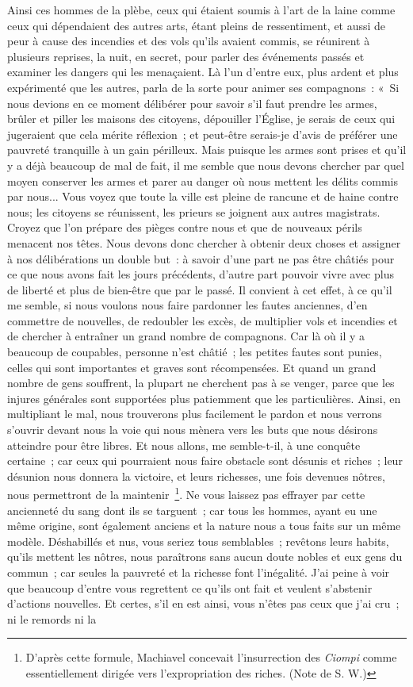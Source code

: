 \documentclass[french,twoside]{book} %
\newenvironment{quoteblock}%
  {\begin{quoting}}
  {\end{quoting}}
\newenvironment{quotebar}{%
    \def\FrameCommand{{\color{rubric!10!}\vrule width 0.5em} \hspace{0.9em}}%
    \def\OuterFrameSep{\itemsep} %
    \MakeFramed {\advance\hsize-\width \FrameRestore}
  }%
  {%
    \endMakeFramed
  }
\renewenvironment{quoteblock}%
  {%
    \savenotes
    \setstretch{0.9}
    \normalfont
    \begin{quotebar}
  }
  {%
    \end{quotebar}
    \spewnotes
  }
\begin{document}
\begin{quoteblock}
 Ainsi ces hommes de la plèbe, ceux qui étaient soumis à l'art de la laine comme ceux qui dépendaient des autres arts, étant pleins de ressentiment, et aussi de peur à cause des incendies et des vols qu'ils avaient commis, se réunirent à plusieurs reprises, la nuit, en secret, pour parler des événements passés et examiner les dangers qui les menaçaient. Là l'un d'entre eux, plus ardent et plus expérimenté que les autres, parla de la sorte pour animer ses compagnons : « Si nous devions en ce moment délibérer pour savoir s'il faut prendre les armes, brûler et piller les maisons des citoyens, dépouiller l'Église, je serais de ceux qui jugeraient que cela mérite réflexion ; et peut-être serais-je d'avis de préférer une pauvreté tranquille à un gain périlleux. Mais puisque les armes sont prises et qu'il y a déjà beaucoup de mal de fait, il me semble que nous devons chercher par quel moyen conserver les armes et parer au danger où nous mettent les délits commis par nous... Vous voyez que toute la ville est pleine de rancune et de haine contre nous; les citoyens se réunissent, les prieurs se joignent aux autres magistrats. Croyez que l'on prépare des pièges contre nous et que de nouveaux périls menacent nos têtes. Nous devons donc chercher à obtenir deux choses et assigner à nos délibérations un double but : à savoir d'une part ne pas être châtiés pour ce que nous avons fait les jours précédents, d'autre part pouvoir vivre avec plus de liberté et plus de bien-être que par le passé. Il convient à cet effet, à ce qu'il me semble, si nous voulons nous faire pardonner les fautes anciennes, d'en commettre de nouvelles, de redoubler les excès, de multiplier vols et incendies et de chercher à entraîner un grand nombre de compagnons. Car là où il y a beaucoup de coupables, personne n'est châtié ; les petites fautes sont punies, celles qui sont impor­tantes et graves sont récompensées. Et quand un grand nombre de gens souf­frent, la plupart ne cherchent pas à se venger, parce que les injures générales sont supportées plus patiemment que les particulières. Ainsi, en multipliant le mal, nous trouverons plus facilement le pardon et nous verrons s'ouvrir devant nous la voie qui nous mènera vers les buts que nous désirons atteindre pour être libres. Et nous allons, me semble-t-il, à une conquête certaine ; car ceux qui pourraient nous faire obstacle sont désunis et riches ; leur désunion nous donnera la victoire, et leurs richesses, une fois devenues nôtres, nous permet­tront de la maintenir \footnote{ D'après cette formule, Machiavel concevait l'insurrection des {\itshape Ciompi} comme essentiellement dirigée vers l'expropriation des riches. (Note de S. W.)}. Ne vous laissez pas effrayer par cette ancienneté du sang dont ils se targuent ; car tous les hommes, ayant eu une même origine, sont également anciens et la nature nous a tous faits sur un même modèle. Déshabillés et nus, vous seriez tous semblables ; revêtons leurs habits, qu'ils mettent les nôtres, nous paraîtrons sans aucun doute nobles et eux gens du commun ; car seules la pauvreté et la richesse font l'inégalité. J'ai peine à voir que beaucoup d'entre vous regrettent ce qu'ils ont fait et veulent s'abstenir d'actions nouvelles. Et certes, s'il en est ainsi, vous n'êtes pas ceux que j'ai cru ; ni le remords ni la 
\end{quoteblock}
\end{document}
